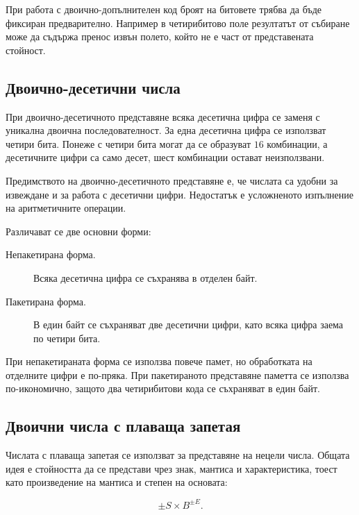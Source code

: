 \begin{supp}[Бележка]
При работа с двоично-допълнителен код броят на битовете трябва да бъде фиксиран предварително. Например в четирибитово поле резултатът от събиране може да съдържа пренос извън полето, който не е част от представената стойност.
\end{supp}

\subsection{Двоично-десетични числа}\label{s:9.2.2}

\begin{defn}
При двоично-десетичното представяне всяка десетична цифра се заменя с уникална двоична последователност. За една десетична цифра се използват четири бита. Понеже с четири бита могат да се образуват $16$ комбинации, а десетичните цифри са само десет, шест комбинации остават неизползвани.
\end{defn}

Предимството на двоично-десетичното представяне е, че числата са удобни за извеждане и за работа с десетични цифри. Недостатък е усложненото изпълнение на аритметичните операции.

Различават се две основни форми:

\begin{description}
    \item[Непакетирана форма.] Всяка десетична цифра се съхранява в отделен байт.
    \item[Пакетирана форма.] В един байт се съхраняват две десетични цифри, като всяка цифра заема по четири бита.
\end{description}

При непакетираната форма се използва повече памет, но обработката на отделните цифри е по-пряка. При пакетираното представяне паметта се използва по-икономично, защото два четирибитови кода се съхраняват в един байт.

\subsection{Двоични числа с плаваща запетая}\label{s:9.2.3}

Числата с плаваща запетая се използват за представяне на нецели числа. Общата идея е стойността да се представи чрез знак, мантиса и характеристика, тоест като произведение на мантиса и степен на основата:

\[
\pm S \times B^{\pm E}.
\]

